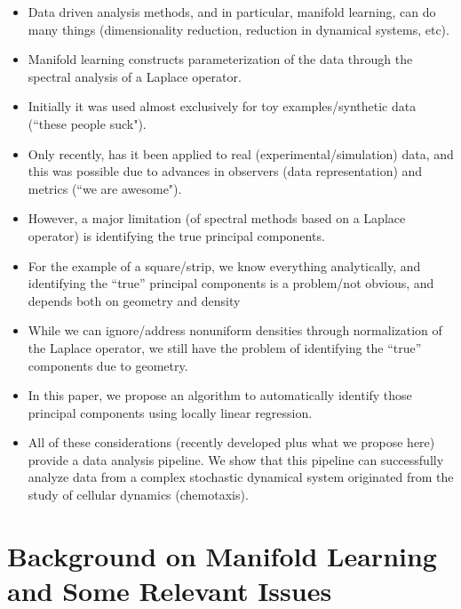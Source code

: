 \documentclass[preprint]{elsarticle}
\begin{document}
\begin{itemize}

\item
Data driven analysis methods, and in particular, manifold learning, can do many things (dimensionality reduction, reduction in dynamical systems, etc). 

\item
Manifold learning constructs parameterization of the data through the spectral analysis of a Laplace operator.

\item
Initially it was used almost exclusively for toy examples/synthetic data (``these people suck").

\item
Only recently, has it been applied to real (experimental/simulation) data, and this was possible due to advances in observers (data representation) and metrics (``we are awesome"). 

\item
However, a major limitation (of spectral methods based on a Laplace operator) is identifying the true principal components.

\item For the example of a square/strip, we know everything analytically, and identifying the ``true'' principal components is a problem/not obvious, and depends both on geometry and density

\item While we can ignore/address nonuniform densities through normalization of the Laplace operator, we still have the problem of identifying the ``true'' components due to geometry. 

\item
In this paper, we propose an algorithm to automatically identify those principal components using locally linear regression.

\item
All of these considerations (recently developed plus what we propose here) provide a data analysis pipeline. We show that this pipeline can successfully analyze data from a complex stochastic dynamical system originated from the study of cellular dynamics (chemotaxis).

\end{itemize}



\section{Background on Manifold Learning and Some Relevant Issues}
\end{document}
